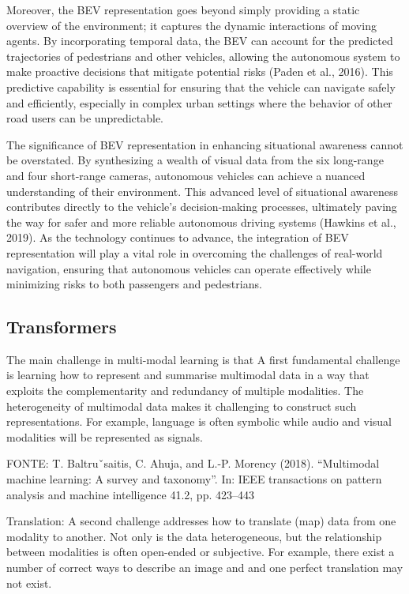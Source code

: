 Moreover, the BEV representation goes beyond simply providing a static overview of the environment; it captures the dynamic interactions of moving agents. By incorporating temporal data, the BEV can account for the predicted trajectories of pedestrians and other vehicles, allowing the autonomous system to make proactive decisions that mitigate potential risks (Paden et al., 2016). This predictive capability is essential for ensuring that the vehicle can navigate safely and efficiently, especially in complex urban settings where the behavior of other road users can be unpredictable.

The significance of BEV representation in enhancing situational awareness cannot be overstated. By synthesizing a wealth of visual data from the six long-range and four short-range cameras, autonomous vehicles can achieve a nuanced understanding of their environment. This advanced level of situational awareness contributes directly to the vehicle's decision-making processes, ultimately paving the way for safer and more reliable autonomous driving systems (Hawkins et al., 2019). As the technology continues to advance, the integration of BEV representation will play a vital role in overcoming the challenges of real-world navigation, ensuring that autonomous vehicles can operate effectively while minimizing risks to both passengers and pedestrians.

\subsection{Transformers}
The main challenge in multi-modal learning is that A first fundamental challenge is learning how to
represent and summarise multimodal data in a way that exploits the
complementarity and redundancy of multiple modalities.
The heterogeneity of multimodal data makes it challenging to construct
such representations. For example, language is often symbolic while audio
and visual modalities will be represented as signals.

FONTE:
T. Baltruˇsaitis, C. Ahuja, and L.-P. Morency (2018). “Multimodal machine learning: A survey and taxonomy”. In: IEEE transactions on pattern
analysis and machine intelligence 41.2, pp. 423–443

Translation: A second challenge addresses how to translate (map) data
from one modality to another. Not only is the data heterogeneous, but
the relationship between modalities is often open-ended or subjective.
For example, there exist a number of correct ways to describe an image
and and one perfect translation may not exist.


